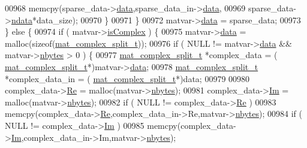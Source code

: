 \begin{DoxyCode}
{{{{{{{{{{{{{{{{{{{{{{00968                     memcpy(sparse\_data->\hyperlink{group___m_a_t_ae2c648cb9eac4ce47f26cddb44246152}{data},sparse\_data\_in->\hyperlink{group___m_a_t_ae2c648cb9eac4ce47f26cddb44246152}{data},
00969                            sparse\_data->\hyperlink{group___m_a_t_a1beb8a8c58a808207cbea650563a9b63}{ndata}*data\_size);
00970             \}
00971         \}
00972         matvar->\hyperlink{group___m_a_t_a5672978efa230bbdecdf38ede781f7fa}{data} = sparse\_data;
00973     \} \textcolor{keywordflow}{else} \{
00974         \textcolor{keywordflow}{if} ( matvar->\hyperlink{group___m_a_t_aeb03b3a69f108dc05470b00443a43739}{isComplex} ) \{
00975             matvar->\hyperlink{group___m_a_t_a5672978efa230bbdecdf38ede781f7fa}{data}   = malloc(\textcolor{keyword}{sizeof}(\hyperlink{group___m_a_t_structmat__complex__split__t}{mat\_complex\_split\_t}));
00976             \textcolor{keywordflow}{if} ( NULL != matvar->\hyperlink{group___m_a_t_a5672978efa230bbdecdf38ede781f7fa}{data} && matvar->\hyperlink{group___m_a_t_abf1c844540503be2df9bb3db93cfe307}{nbytes} > 0 ) \{
00977                 \hyperlink{group___m_a_t_structmat__complex__split__t}{mat\_complex\_split\_t} *complex\_data    = (
      \hyperlink{group___m_a_t_structmat__complex__split__t}{mat\_complex\_split\_t}*)matvar->\hyperlink{group___m_a_t_a5672978efa230bbdecdf38ede781f7fa}{data};
00978                 \hyperlink{group___m_a_t_structmat__complex__split__t}{mat\_complex\_split\_t} *complex\_data\_in = (
      \hyperlink{group___m_a_t_structmat__complex__split__t}{mat\_complex\_split\_t}*)data;
00979 
00980                 complex\_data->\hyperlink{group___m_a_t_a484a93607508adac2bce53a0252e0325}{Re} = malloc(matvar->\hyperlink{group___m_a_t_abf1c844540503be2df9bb3db93cfe307}{nbytes});
00981                 complex\_data->\hyperlink{group___m_a_t_a7182d10b0d3598415887376065440946}{Im} = malloc(matvar->\hyperlink{group___m_a_t_abf1c844540503be2df9bb3db93cfe307}{nbytes});
00982                 \textcolor{keywordflow}{if} ( NULL != complex\_data->\hyperlink{group___m_a_t_a484a93607508adac2bce53a0252e0325}{Re} )
00983                     memcpy(complex\_data->\hyperlink{group___m_a_t_a484a93607508adac2bce53a0252e0325}{Re},complex\_data\_in->Re,matvar->\hyperlink{group___m_a_t_abf1c844540503be2df9bb3db93cfe307}{nbytes});
00984                 \textcolor{keywordflow}{if} ( NULL != complex\_data->\hyperlink{group___m_a_t_a7182d10b0d3598415887376065440946}{Im} )
00985                     memcpy(complex\_data->\hyperlink{group___m_a_t_a7182d10b0d3598415887376065440946}{Im},complex\_data\_in->Im,matvar->\hyperlink{group___m_a_t_abf1c844540503be2df9bb3db93cfe307}{nbytes});
}}}}}}}}}}}}}}}}}}}}}}
\end{DoxyCode}
